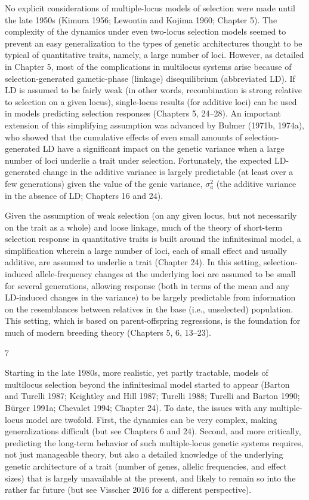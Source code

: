 \documentclass{article}
\begin{document}
No explicit considerations of multiple-locus models of selection were made until the late 1950s (Kimura 1956; Lewontin and Kojima 1960; Chapter 5). The complexity of the dynamics under even two-locus selection models seemed to prevent an easy generalization to the types of genetic architectures thought to be typical of quantitative traits, namely, a large number of loci. However, as detailed in Chapter 5, most of the complications in multilocus systems arise because of selection-generated gametic-phase (linkage) disequilibrium (abbreviated LD). If LD is assumed to be fairly weak (in other words, recombination is strong relative to selection on a given locus), single-locus results (for additive loci) can be used in models predicting selection responses (Chapters 5, 24–28). An important extension of this simplifying assumption was advanced by Bulmer (1971b, 1974a), who showed that the cumulative effects of even small amounts of selection-generated LD have a significant impact on the genetic variance when a large number of loci underlie a trait under selection. Fortunately, the expected LD-generated change in the additive variance is largely predictable (at least over a few generations) given the value of the genic variance,  $ \sigma_{a}^{2} $ (the additive variance in the absence of LD; Chapters 16 and 24).

Given the assumption of weak selection (on any given locus, but not necessarily on the trait as a whole) and loose linkage, much of the theory of short-term selection response in quantitative traits is built around the infinitesimal model, a simplification wherein a large number of loci, each of small effect and usually additive, are assumed to underlie a trait (Chapter 24). In this setting, selection-induced allele-frequency changes at the underlying loci are assumed to be small for several generations, allowing response (both in terms of the mean and any LD-induced changes in the variance) to be largely predictable from information on the resemblances between relatives in the base (i.e., unselected) population. This setting, which is based on parent-offspring regressions, is the foundation for much of modern breeding theory (Chapters 5, 6, 13–23).

7

Starting in the late 1980s, more realistic, yet partly tractable, models of multilocus selection beyond the infinitesimal model started to appear (Barton and Turelli 1987; Keightley and Hill 1987; Turelli 1988; Turelli and Barton 1990; Bürger 1991a; Chevalet 1994; Chapter 24). To date, the issues with any multiple-locus model are twofold. First, the dynamics can be very complex, making generalizations difficult (but see Chapters 6 and 24). Second, and more critically, predicting the long-term behavior of such multiple-locus genetic systems requires, not just manageable theory, but also a detailed knowledge of the underlying genetic architecture of a trait (number of genes, allelic frequencies, and effect sizes) that is largely unavailable at the present, and likely to remain so into the rather far future (but see Visscher 2016 for a different perspective).
\end{document}
